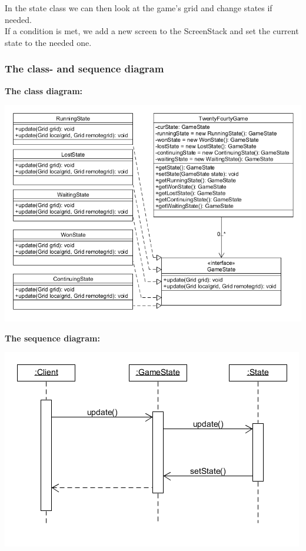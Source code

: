 \documentclass[a4paper,11pt,report]{scrartcl}
\begin{document}
In the state class we can then look at the game's grid and change states if needed.\\

If a condition is met, we add a new screen to the ScreenStack and set the current state to the needed one.

\newpage\subsubsection{The class- and sequence diagram}
\textbf{The class diagram:}\\
\centerline{\includegraphics[scale=0.7]{sources/statePatternUML}}

\newpage\textbf{The sequence diagram:}\\
\centerline{\includegraphics[scale=1]{sources/statePatternSequence}}
\end{document}
